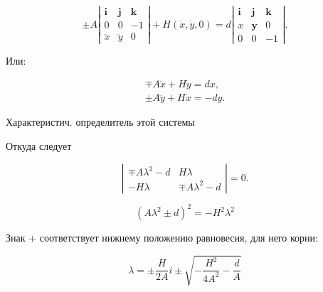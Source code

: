 \documentclass[10pt]{article}
\begin{document}
\[

\pm A\left|\begin{array}{rrr}

\boldsymbol{i} & \boldsymbol{j} & \boldsymbol{k} \\

0 & 0 & -1 \\

\ddot{x} & \ddot{y} & 0

\end{array}\right|+H(\dot{x}, \dot{y}, 0)=d\left|\begin{array}{rrr}

\boldsymbol{i} & \boldsymbol{j} & \boldsymbol{k} \\

x & \boldsymbol{y} & 0 \\

0 & 0 & -1

\end{array}\right| .

\]



Или:



\[

\begin{gathered}

\mp A \ddot{x}+H \dot{y}=d x, \\

\pm A \ddot{y}+H \dot{x}=-d y .

\end{gathered}

\]



Характеристич. определитель этой системы



Откуда следует



\[

\left|\begin{array}{cc}

\mp A \lambda^{2}-d & H \lambda \\

-H \lambda & \mp A \lambda^{2}-d

\end{array}\right|=0 .

\]



\[

\left(A \lambda^{2} \pm d\right)^{2}=-H^{2} \lambda^{2}

\]



Знак + соответствует нижнему положению равновесия, для него корни:



\[

\lambda= \pm \frac{H}{2 A} i \pm \sqrt{-\frac{H^{2}}{4 A^{2}}-\frac{d}{A}}

\]
\end{document}

